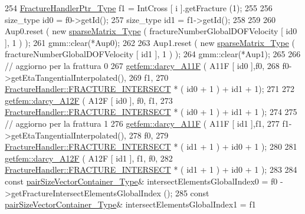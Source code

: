 \begin{DoxyCode}
254         \hyperlink{FractureHandler_8h_af23fb7a30aaff864bd42587af4f1e78a}{FractureHandlerPtr\_Type} f1 = IntCross [ i ].getFracture (1);
255         
256         size\_type id0 = f0->getId();
257         size\_type id1 = f1->getId();
258         
259         
260         Aup0.reset ( \textcolor{keyword}{new} \hyperlink{Core_8h_afba9f623673e2ae32054015bdb5500f9}{sparseMatrix\_Type} ( fractureNumberGlobalDOFVelocity [ id0 ], 1 ) 
      );
261         gmm::clear(*Aup0);
262 
263         Aup1.reset ( \textcolor{keyword}{new} \hyperlink{Core_8h_afba9f623673e2ae32054015bdb5500f9}{sparseMatrix\_Type} ( fractureNumberGlobalDOFVelocity [ id1 ], 1 ) 
      );
264         gmm::clear(*Aup1);
265 
266         \textcolor{comment}{// aggiorno per la frattura 0}
267         \hyperlink{namespacegetfem_aba6f1b4f1d395aae3d96071cad4953a2}{getfem::darcy\_A11F} ( A11F [ id0 ],f0,
268                              f0->getEtaTangentialInterpolated(), 
269                              f1,
270                              \hyperlink{classFractureHandler_a495ad4fc72d0c47c8f0424842f1153aaa781cae3f3b99bf9357fed2833d315537}{FractureHandler::FRACTURE\_INTERSECT} * ( id0
       + 1 ) + id1 + 1);
271 
272         \hyperlink{namespacegetfem_ab62aa98cfcf55810e1518906202cbedc}{getfem::darcy\_A12F} ( A12F [ id0 ], f0, f1,
273                              \hyperlink{classFractureHandler_a495ad4fc72d0c47c8f0424842f1153aaa781cae3f3b99bf9357fed2833d315537}{FractureHandler::FRACTURE\_INTERSECT} * ( id0
       + 1 ) + id1 + 1 );
274 
275         \textcolor{comment}{// aggiorno per la frattura 1}
276         \hyperlink{namespacegetfem_aba6f1b4f1d395aae3d96071cad4953a2}{getfem::darcy\_A11F} ( A11F [ id1 ],f1,
277                              f1->getEtaTangentialInterpolated(),
278                              f0,
279                              \hyperlink{classFractureHandler_a495ad4fc72d0c47c8f0424842f1153aaa781cae3f3b99bf9357fed2833d315537}{FractureHandler::FRACTURE\_INTERSECT} * ( id1
       + 1 ) + id0 + 1 );
280 
281         \hyperlink{namespacegetfem_ab62aa98cfcf55810e1518906202cbedc}{getfem::darcy\_A12F} ( A12F [ id1 ], f1, f0,
282                              \hyperlink{classFractureHandler_a495ad4fc72d0c47c8f0424842f1153aaa781cae3f3b99bf9357fed2833d315537}{FractureHandler::FRACTURE\_INTERSECT} * ( id1
       + 1 ) + id0 + 1 );
283 
284         \textcolor{keyword}{const} \hyperlink{Core_8h_a9bc476e433f99b82a9c2b8560735c7b5}{pairSizeVectorContainer\_Type}& intersectElementsGlobalIndex0 = f0
      ->getFractureIntersectElementsGlobalIndex ();
285         \textcolor{keyword}{const} \hyperlink{Core_8h_a9bc476e433f99b82a9c2b8560735c7b5}{pairSizeVectorContainer\_Type}& intersectElementsGlobalIndex1 = f1

\end{DoxyCode}
